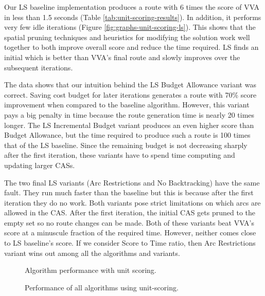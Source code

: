 \documentclass[honors]{union-cs-thesis}
\begin{document}
Our LS baseline implementation produces a route with 6 times the score of VVA in less than 1.5 seconds (Table \ref{tab:unit-scoring-results}). In addition, it performs very few idle iterations (Figure \ref{fig:graphs-unit-scoring-ls}). This shows that the spatial pruning techniques and heuristics for modifying the solution work well together to both improve overall score and reduce the time required. LS finds an initial which is better than VVA's final route and slowly improves over the subsequent iterations.

The data shows that our intuition behind the LS Budget Allowance variant was correct. Saving cost budget for later iterations generates a route with 70\% score improvement when compared to the baseline algorithm. However, this variant pays a big penalty in time because the route generation time is nearly 20 times longer. The LS Incremental Budget variant produces an even higher score than Budget Allowance, but the time required to produce such a route is 100 times that of the LS baseline. Since the remaining budget is not decreasing sharply after the first iteration, these variants have to spend time computing and updating larger CASs.

The two final LS variants (Arc Restrictions and No Backtracking) have the same fault. They run much faster than the baseline but this is because after the first iteration they do no work. Both variants pose strict limitations on which arcs are allowed in the CAS. After the first iteration, the initial CAS gets pruned to the empty set so no route changes can be made. Both of these variants beat VVA's score at a minuscule fraction of the required time. However, neither comes close to LS baseline's score. If we consider Score to Time ratio, then Arc Restrictions variant wins out among all the algorithms and variants.

\begin{figure}

\caption{Algorithm performance with unit scoring.}
\label{fig:graphs-unit-scoring}
\end{figure}


\begin{figure}

\caption{Performance of all algorithms using unit-scoring.}
\end{figure}
\end{document}
